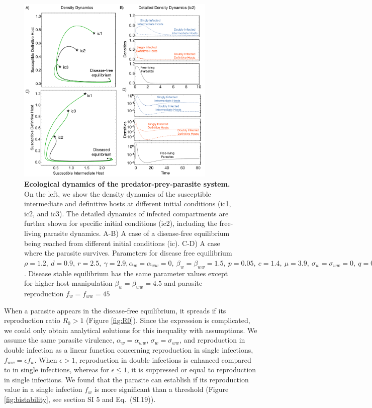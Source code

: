 \documentclass[a4paper]{scrartcl}
\begin{document}
\begin{figure}[!ht]
\centering
\captionsetup{format=plain}
\includegraphics[width=0.85\textwidth]{ecotraject_nonlinear.pdf}
\caption{\textbf{Ecological dynamics of the predator-prey-parasite system.} 
On the left, we show the density dynamics of the susceptible intermediate and definitive hosts at different initial conditions (ic1, ic2, and ic3). 
The detailed dynamics of infected compartments are further shown for specific initial conditions (ic2), including the free-living parasite dynamics.
A-B) A case of a disease-free equilibrium being reached from different initial conditions (ic). C-D) A case where the parasite survives.
Parameters for disease free equilibrium $\rho =  1.2, \ d = 0.9, \  r = 2.5, \ \gamma =  2.9, \alpha_w = \alpha_{ww} =  0, \ \beta_w = \beta_{ww} = 1.5, \ p = 0.05, \  c = 1.4, \ \mu = 3.9, \ \sigma_w = \sigma_{ww} = 0, \ q = 0.05, \ f_w = f_{ww} = 7.5, \ \delta = 0.9, \ k = 0.26, \ h = 0.6$. 
Disease stable equilibrium has the same parameter values except for higher host manipulation $ \beta_w =  \beta_{ww} = 4.5$ and parasite reproduction $ f_w  = f_{ww} = 45$}
\label{fig:ecotraject:nonlinear}
\end{figure}

When a parasite appears in the disease-free equilibrium, it spreads if its reproduction ratio $R_0 > 1$ (Figure \ref{fig:R0}). 
Since the expression is complicated, we could only obtain analytical solutions for this inequality with assumptions. 
We assume the same parasite virulence, $\alpha_w = \alpha_{ww}$, $\sigma_w = \sigma_{ww}$, and reproduction in double infection as a linear function concerning reproduction in single infections, $f_{ww} = \epsilon f_w$. 
When $\epsilon > 1$, reproduction in double infections is enhanced compared to in single infections, whereas for $\epsilon \leq 1$, it is suppressed or equal to reproduction in single infections.
We found that the parasite can establish if its reproduction value in a single infection $f_w$ is more significant than a threshold (Figure \ref{fig:bistability}, see section SI 5 and Eq.~(SI.19)). 
\end{document}
